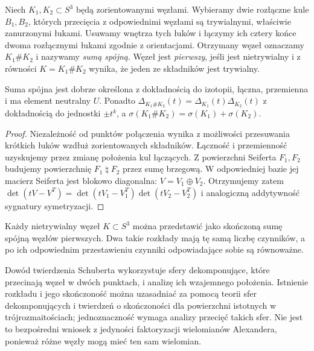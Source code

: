\begin{definicja}
Niech $K_1,K_2\subset S^3$ będą zorientowanymi węzłami.
Wybieramy dwie rozłączne kule $B_1,B_2$, których przecięcia
z odpowiednimi węzłami są trywialnymi, właściwie zanurzonymi
łukami. Usuwamy wnętrza tych łuków i łączymy ich cztery końce
dwoma rozłącznymi łukami zgodnie z orientacjami. Otrzymany
węzeł oznaczamy $K_1\#K_2$ i nazywamy \emph{sumą spójną}.
Węzeł jest \emph{pierwszy}, jeśli jest nietrywialny i z równości
$K=K_1\#K_2$ wynika, że jeden ze składników jest trywialny.
\end{definicja}

\begin{stwierdzenie}
Suma spójna jest dobrze określona z dokładnością do izotopii,
łączna, przemienna i ma element neutralny $U$.
Ponadto $\Delta_{K_1\#K_2}(t)=\Delta_{K_1}(t)\Delta_{K_2}(t)$
z dokładnością do jednostki $\pm t^k$, a
$\sigma(K_1\#K_2)=\sigma(K_1)+\sigma(K_2)$.
\end{stwierdzenie}

\begin{proof}
Niezależność od punktów połączenia wynika z możliwości
przesuwania krótkich łuków wzdłuż zorientowanych składników.
Łączność i przemienność uzyskujemy przez zmianę położenia
kul łączących. Z powierzchni Seiferta $F_1,F_2$ budujemy
powierzchnię $F_1\mathbin{\natural}F_2$ przez sumę brzegową.
W odpowiedniej bazie jej macierz Seiferta jest blokowo diagonalna:
$V=V_1\oplus V_2$. Otrzymujemy zatem
$\det(tV-V^T)=\det(tV_1-V_1^T)\det(tV_2-V_2^T)$
i analogiczną addytywność sygnatury symetryzacji.
\end{proof}

\begin{twierdzenie}
Każdy nietrywialny węzeł $K\subset S^3$ można przedstawić
jako skończoną sumę spójną węzłów pierwszych. Dwa takie
rozkłady mają tę samą liczbę czynników, a po ich odpowiednim
przestawieniu czynniki odpowiadające sobie są równoważne.
\end{twierdzenie}

\begin{uwaga}
Dowód twierdzenia Schuberta wykorzystuje sfery dekomponujące,
które przecinają węzeł w dwóch punktach, i analizę ich
wzajemnego położenia. Istnienie rozkładu i jego skończoność można uzasadniać
za pomocą teorii sfer dekomponujących i twierdzeń o skończoności
dla powierzchni istotnych w trójrozmaitościach; jednoznaczność
wymaga analizy przecięć takich sfer. Nie jest to
bezpośredni wniosek z jedyności faktoryzacji wielomianów
Alexandera, ponieważ różne węzły mogą mieć ten sam wielomian.
\end{uwaga}

